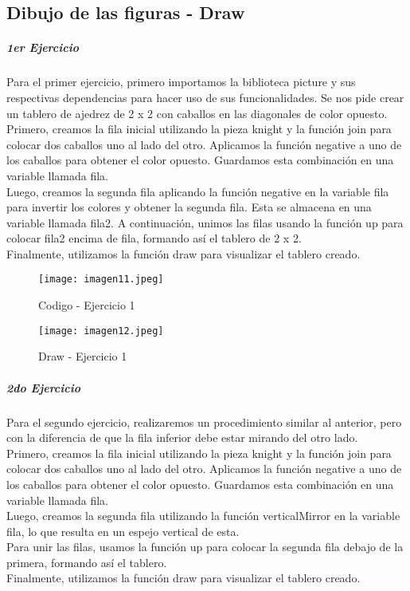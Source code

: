 \documentclass[10pt, a4paper]{article}
\begin{document}
\subsection*{Dibujo de las figuras - Draw}
	\subparagraph{1er Ejercicio}
		\begin{flushleft}
			Para el primer ejercicio, primero importamos la biblioteca picture y sus respectivas dependencias para hacer uso de sus funcionalidades. Se nos pide crear un tablero de ajedrez de 2 x 2 con caballos en las diagonales de color opuesto. \\
			Primero, creamos la fila inicial utilizando la pieza knight y la función join para colocar dos caballos uno al lado del otro. Aplicamos la función negative a uno de los caballos para obtener el color opuesto. Guardamos esta combinación en una variable llamada fila. \\		
			Luego, creamos la segunda fila aplicando la función negative en la variable fila para invertir los colores y obtener la segunda fila. Esta se almacena en una variable llamada fila2.			
			A continuación, unimos las filas usando la función up para colocar fila2 encima de fila, formando así el tablero de 2 x 2. \\		
			Finalmente, utilizamos la función draw para visualizar el tablero creado.
		\end{flushleft}
		\begin{figure}[h]
			\centering
			\texttt{[image: imagen11.jpeg]}
			\caption{Codigo - Ejercicio 1}
		\end{figure}
		\begin{figure}[h]
			\centering
			\texttt{[image: imagen12.jpeg]}
			\caption{Draw - Ejercicio 1}
		\end{figure} 
		\vspace*{2cm}
	\subparagraph*{2do Ejercicio}
		\begin{flushleft}
			Para el segundo ejercicio, realizaremos un procedimiento similar al anterior, pero con la diferencia de que la fila inferior debe estar mirando del otro lado. \\	
			Primero, creamos la fila inicial utilizando la pieza knight y la función join para colocar dos caballos uno al lado del otro. Aplicamos la función negative a uno de los caballos para obtener el color opuesto. Guardamos esta combinación en una variable llamada fila.\\
			Luego, creamos la segunda fila utilizando la función verticalMirror en la variable fila, lo que resulta en un espejo vertical de esta.	\\		
			Para unir las filas, usamos la función up para colocar la segunda fila debajo de la primera, formando así el tablero.\\			
			Finalmente, utilizamos la función draw para visualizar el tablero creado.
		\end{flushleft}
\end{document}
